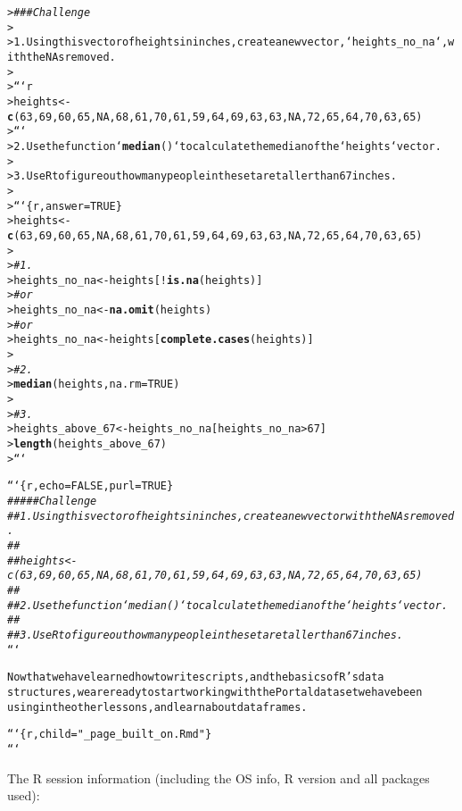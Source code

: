 \documentclass{article}\usepackage[]{graphicx}\usepackage[]{xcolor}
\makeatletter
\newcommand{\hlstr}[1]{\textcolor[rgb]{0.192,0.494,0.8}{#1}}%
\newcommand{\hlcom}[1]{\textcolor[rgb]{0.678,0.584,0.686}{\textit{#1}}}%
\newcommand{\hlkwd}[1]{\textcolor[rgb]{0.737,0.353,0.396}{\textbf{#1}}}%
\newenvironment{kframe}{%
 \def\at@end@of@kframe{}%
 \ifinner\ifhmode%
  \def\at@end@of@kframe{\end{minipage}}%
  \begin{minipage}{\columnwidth}%
 \fi\fi%
 \def\FrameCommand##1{\hskip\@totalleftmargin \hskip-\fboxsep
 \colorbox{shadecolor}{##1}\hskip-\fboxsep
     \hskip-\linewidth \hskip-\@totalleftmargin \hskip\columnwidth}%
 \MakeFramed {\advance\hsize-\width
   \@totalleftmargin\z@ \linewidth\hsize
   \@setminipage}}%
 {\par\unskip\endMakeFramed%
 \at@end@of@kframe}
\newenvironment{knitrout}{}{} %
\makeatother
\begin{document}
\begin{knitrout}
\begin{kframe}
\begin{alltt}
> \hlcom{### Challenge}
>
> 1. Using this vector of heights in inches, create a new vector, `heights_no_na`, with the NAs removed.
>
>     ```r
>     heights <- \hlkwd{c}(63, 69, 60, 65, NA, 68, 61, 70, 61, 59, 64, 69, 63, 63, NA, 72, 65, 64, 70, 63, 65)
>     ```
> 2. Use the function `\hlkwd{median}()` to calculate the median of the `heights` vector.
>
> 3. Use R to figure out how many people in the set are taller than 67 inches.
>
> ```\{r, answer=TRUE\}
> heights <- \hlkwd{c}(63, 69, 60, 65, NA, 68, 61, 70, 61, 59, 64, 69, 63, 63, NA, 72, 65, 64, 70, 63, 65)
>
> \hlcom{# 1.}
> heights_no_na <- heights[!\hlkwd{is.na}(heights)]
> \hlcom{# or}
> heights_no_na <- \hlkwd{na.omit}(heights)
> \hlcom{# or}
> heights_no_na <- heights[\hlkwd{complete.cases}(heights)]
>
> \hlcom{# 2.}
> \hlkwd{median}(heights, na.rm = TRUE)
>
> \hlcom{# 3.}
> heights_above_67 <- heights_no_na[heights_no_na > 67]
> \hlkwd{length}(heights_above_67)
> ```


```\{r, echo = FALSE, purl = TRUE\}
\hlcom{## ### Challenge}
\hlcom{## 1. Using this vector of heights in inches, create a new vector with the NAs removed.}
\hlcom{##}
\hlcom{##    heights <- c(63, 69, 60, 65, NA, 68, 61, 70, 61, 59, 64, 69, 63, 63, NA, 72, 65, 64, 70, 63, 65)}
\hlcom{##}
\hlcom{## 2. Use the function `median()` to calculate the median of the `heights` vector.}
\hlcom{##}
\hlcom{## 3. Use R to figure out how many people in the set are taller than 67 inches.}
```

Now that we have learned how to write scripts, and the basics of R's data
structures, we are ready to start working with the Portal dataset we have been
using in the other lessons, and learn about data frames.


```\{r, child=\hlstr{"_page_built_on.Rmd"}\}
```
\end{alltt}


{\ttfamily\noindent\bfseries\color{errorcolor}{\#\# Error: attempt to use zero-length variable name}}\end{kframe}
\end{knitrout}

The R session information (including the OS info, R version and all
packages used):
\end{document}
